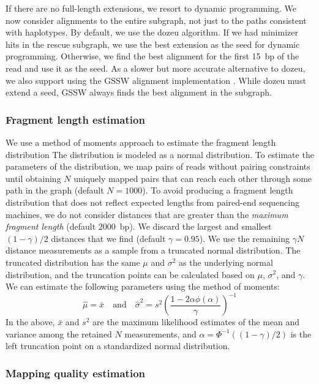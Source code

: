 \documentclass[11pt]{ucscthesis}
\newcommand{\param}[1]{\emph{#1}}
\begin{document}
If there are no full-length extensions, we resort to dynamic programming.
We now consider alignments to the entire subgraph, not just to the paths consistent with haplotypes.
By default, we use the dozeu algorithm.
If we had minimizer hits in the rescue subgraph, we use the best extension as the seed for dynamic programming.
Otherwise, we find the best alignment for the first 15~bp of the read and use it as the seed.
As a slower but more accurate alternative to dozeu, we also support using the GSSW alignment implementation \cite{zhao_gssw_2013}.
While dozeu must extend a seed, GSSW always finds the best alignment in the subgraph.


\subsubsection{Fragment length estimation}
\label{subsec:aim2:fragment-length}

We use a method of moments approach to estimate the fragment length distribution
The distribution is modeled as a normal distribution.
To estimate the parameters of the distribution, we map pairs of reads without pairing constraints until obtaining $N$ uniquely mapped pairs that can reach each other through some path in the graph (default $N = 1000$).
To avoid producing a fragment length distribution that does not reflect expected lengths from paired-end sequencing machines, we do not consider distances that are greater than the \param{maximum fragment length} (default $2000$~bp).
We discard the largest and smallest $(1 - \gamma) / 2$ distances that we find (default $\gamma = 0.95$).
We use the remaining $\gamma N$ distance measurements as a sample from a truncated normal distribution.
The truncated distribution has the same $\mu$ and $\sigma^{2}$ as the underlying normal distribution, and the truncation points can be calculated based on $\mu$, $\sigma^{2}$, and $\gamma$.
We can estimate the following parameters using the method of moments:
$$
\hat{\mu} = \bar{x} \quad \textrm{and} \quad
\hat{\sigma}^{2} = s^{2} \left( \frac{1 - 2 \alpha \phi(\alpha)}{\gamma} \right)^{-1}
$$
In the above, $\bar{x}$ and $s^{2}$ are the maximum likelihood estimates of the mean and variance among the retained $N$ measurements, and $\alpha = \Phi^{-1}((1 - \gamma) / 2)$ is the left truncation point on a standardized normal distribution.


\subsubsection{Mapping quality estimation}
\end{document}
